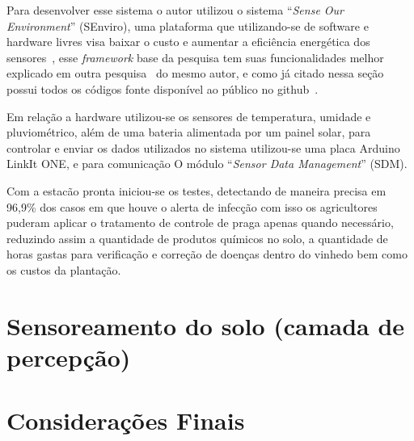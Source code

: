 \documentclass[
	article,			%
	12pt,				%
	oneside,			%
	a4paper,			%
	english,			%
	brazil,				%
	sumario=tradicional
	]{abntex2}
\begin{document}
Para desenvolver esse sistema o autor utilizou o sistema ``\textit{Sense Our Environment}'' (SEnviro), uma plataforma que utilizando-se de software e hardware livres visa baixar o custo e aumentar a eficiência energética dos sensores~\cite{2}, esse \textit{framework} base da pesquisa tem suas funcionalidades melhor explicado em outra pesquisa~\cite{SEnviro} do mesmo autor, e como já citado nessa seção possui todos os códigos fonte disponível ao público no github~\cite{SEnviro_Github}.

Em relação a hardware utilizou-se os sensores de temperatura, umidade e pluviométrico, além de uma bateria alimentada por um painel solar, para controlar e enviar os dados utilizados no sistema utilizou-se uma placa Arduino LinkIt ONE, e para comunicação O módulo ``\textit{Sensor Data Management}'' (SDM).

Com a estacão pronta iniciou-se os testes, detectando de maneira precisa em 96,9\% dos casos em que houve o alerta de infecção com isso os agricultores puderam aplicar o tratamento de controle de praga apenas quando necessário, reduzindo assim a quantidade de produtos químicos no solo, a quantidade de horas gastas para verificação e correção de doenças dentro do vinhedo bem como os custos da plantação.

\section{Sensoreamento do solo (camada de percepção)}\label{Sensoreamento do solo (camada de percepção)}

\section{Considerações Finais}
\postextual

\cleardoublepage


%
%
\end{document}
